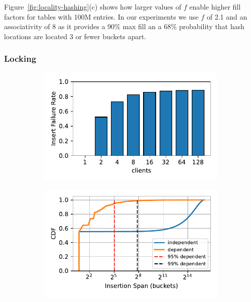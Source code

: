 Figure~\ref{fig:locality-hashing}(c) shows how larger values of $f$
enable higher fill factors for tables with 100M entries.  In
our experiments we use $f$ of 2.1 and an associativity of 8
as it provides a 90\% max fill an a 68\% probability that
hash locations are located 3 or fewer buckets apart.


\subsubsection{Locking}
\label{sec:locking}

\begin{figure}[t]
    \centering
    \begin{subfigure}{0.3\linewidth}
        \includegraphics[width=0.99\linewidth]{fig/optimistic_failures.pdf}
    \end{subfigure}
    \begin{subfigure}{0.3\linewidth}
        \includegraphics[width=0.99\linewidth]{fig/insertion_span.pdf}

\end{subfigure}
\end{figure}
